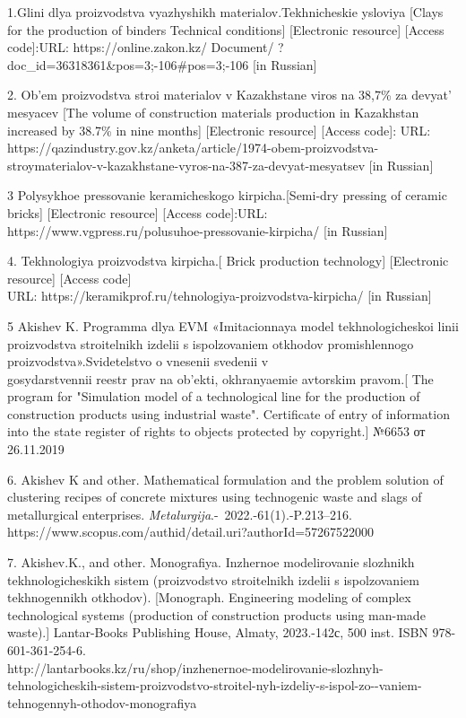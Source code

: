 \begin{noparindent}

1.Glini dlya proizvodstva vyazhyshikh materialov.Tekhnicheskie ysloviya
{[}Clays for the production of binders Technical conditions{]}
{[}Electronic resource{]} {[}Access code{]}:URL:
https://online.zakon.kz/ Document/
?doc\_id=36318361\&pos=3;-106\#pos=3;-106 {[}in Russian{]}

2. Ob'em proizvodstva stroi materialov v Kazakhstane viros na 38,7\% za
devyat' mesyacev {[}The volume of construction materials production in
Kazakhstan increased by 38.7\% in nine months{]} {[}Electronic
resource{]} {[}Access code{]}: URL:~
https://qazindustry.gov.kz/anketa/article/1974-obem-proizvodstva-stroymaterialov-v-kazakhstane-vyros-na-387-za-devyat-mesyatsev
{[}in Russian{]}

3 Polysykhoe pressovanie keramicheskogo kirpicha.{[}Semi-dry pressing of
ceramic bricks{]} {[}Electronic resource{]} {[}Access code{]}:URL:
https://www.vgpress.ru/polusuhoe-pressovanie-kirpicha/ {[}in Russian{]}

4. Tekhnologiya proizvodstva kirpicha.{[} Brick production technology{]}
{[}Electronic resource{]} {[}Access code{]}\\URL:
https://keramikprof.ru/tehnologiya-proizvodstva-kirpicha/ {[}in
Russian{]}

5 Akishev K. Programma dlya EVM «Imitacionnaya model tekhnologicheskoi
linii proizvodstva stroitelnikh izdelii s ispolzovaniem otkhodov
promishlennogo proizvodstva».Svidetelstvo o vnesenii svedenii v
\\gosydarstvennii reestr prav na ob'ekti, okhranyaemie avtorskim
pravom.{[} The program for "Simulation model of a technological line for
the production of construction products using industrial waste".
Certificate of entry of information into the state register of rights to
objects protected by copyright.{]} №6653 от 26.11.2019

6. Akishev K and other. Mathematical formulation and the problem
solution of clustering recipes of concrete mixtures using technogenic
waste and slags of metallurgical enterprises.
\emph{Metalurgija}.-~2022.-61(1).-P.213--216.
https://www.scopus.com/authid/detail.uri?authorId=57267522000

7. Akishev.K., and other. Monografiya. Inzhernoe modelirovanie slozhnikh
tekhnologicheskikh sistem (proizvodstvo stroitelnikh izdelii s
ispolzovaniem tekhnogennikh otkhodov). {[}Monograph. Engineering
modeling of complex technological systems (production of construction
products using man-made waste).{]} Lantar-Books Publishing House,
Almaty, 2023.-142с, 500 inst. ISBN 978-601-361-254-6.
\\http://lantarbooks.kz/ru/shop/inzhenernoe-modelirovanie-slozhnyh-tehnologicheskih-sistem-proizvodstvo-stroitel-nyh-izdeliy-s-ispol-zo-\/-vaniem-tehnogennyh-othodov-monografiya


\end{noparindent}
